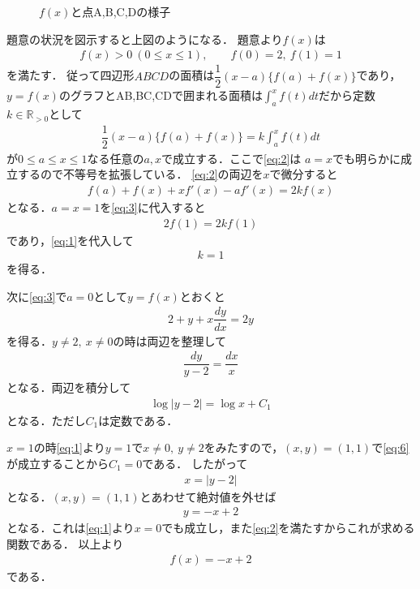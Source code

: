 \documentclass[../../main.tex]{subfiles}
\begin{document}
\begin{figure}[htb]
\begin{center}
    \caption{$f(x)$と点A,B,C,Dの様子}
  \end{center}
\end{figure}

題意の状況を図示すると上図のようになる．
題意より$f(x)$は
\begin{align}
  f(x)>0\ (0\le x\le1), \qquad f(0)=2,\ f(1)=1 \label{eq:1}
\end{align}
を満たす．
従って四辺形$ABCD$の面積は$\dfrac{1}{2}(x-a)\{f(a)+f(x)\}$であり，$y=f(x)$のグラフとAB,BC,CDで囲まれる面積は$\int_a^xf(t)dt$だから定数$k\in\mathbb{R}_{>0}$として
\begin{align}
  \dfrac{1}{2}(x-a)\{f(a)+f(x)\}=k\int_a^xf(t)dt \label{eq:2}
\end{align}
が$0\le a\le x\le1$なる任意の$a,x$で成立する．ここで\cref{eq:2}は $a=x$でも明らかに成立するので不等号を拡張している．
\cref{eq:2}の両辺を$x$で微分すると
\begin{align}
  f(a)+f(x)+xf'(x)-af'(x)=2kf(x) \label{eq:3}
\end{align}
となる．$a=x=1$を\cref{eq:3}に代入すると
\begin{align}
  2f(1) = 2k f(1)
\end{align}
であり，\cref{eq:1}を代入して
\begin{align}
  k = 1 \label{eq:4}
\end{align}
を得る．

次に\cref{eq:3}で$a=0$として$y=f(x)$とおくと
\begin{align}
  2+y+x\dfrac{dy}{dx}=2y \label{eq:5}
\end{align}
を得る．$y\ne 2,\ x\ne 0$の時は両辺を整理して
\begin{align}
  \dfrac{dy}{y-2}=\dfrac{dx}{x}
\end{align}
となる．両辺を積分して
\begin{align}
  \log|y-2|=\log x+C_1 \label{eq:6}
\end{align}
となる．ただし$C_1$は定数である．

$x=1$の時\cref{eq:1}より$y=1$で$x\ne0,\ y\ne2$をみたすので，$(x,y)=(1,1)$で\cref{eq:6}が成立することから$C_1=0$である．
したがって
\begin{align}
  x=|y-2|
\end{align}
となる．$(x,y)=(1,1)$とあわせて絶対値を外せば
\begin{align}
  y=-x+2 \label{eq:7}
\end{align}
となる．これは\cref{eq:1}より$x=0$でも成立し，また\cref{eq:2}を満たすからこれが求める関数である．
以上より
\begin{align}
  f(x) = -x+2
\end{align}
である．

\newpage
\end{document}
